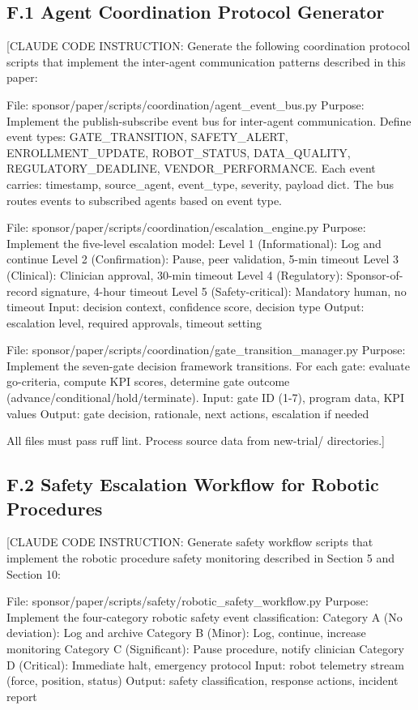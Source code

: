 \subsection*{F.1 Agent Coordination Protocol Generator}

[CLAUDE CODE INSTRUCTION: Generate the following coordination protocol scripts that
implement the inter-agent communication patterns described in this paper:

File: sponsor/paper/scripts/coordination/agent\_event\_bus.py
Purpose: Implement the publish-subscribe event bus for inter-agent communication.
Define event types: GATE\_TRANSITION, SAFETY\_ALERT, ENROLLMENT\_UPDATE,
ROBOT\_STATUS, DATA\_QUALITY, REGULATORY\_DEADLINE, VENDOR\_PERFORMANCE.
Each event carries: timestamp, source\_agent, event\_type, severity, payload dict.
The bus routes events to subscribed agents based on event type.

File: sponsor/paper/scripts/coordination/escalation\_engine.py
Purpose: Implement the five-level escalation model:
Level 1 (Informational): Log and continue
Level 2 (Confirmation): Pause, peer validation, 5-min timeout
Level 3 (Clinical): Clinician approval, 30-min timeout
Level 4 (Regulatory): Sponsor-of-record signature, 4-hour timeout
Level 5 (Safety-critical): Mandatory human, no timeout
Input: decision context, confidence score, decision type
Output: escalation level, required approvals, timeout setting

File: sponsor/paper/scripts/coordination/gate\_transition\_manager.py
Purpose: Implement the seven-gate decision framework transitions.
For each gate: evaluate go-criteria, compute KPI scores,
determine gate outcome (advance/conditional/hold/terminate).
Input: gate ID (1-7), program data, KPI values
Output: gate decision, rationale, next actions, escalation if needed

All files must pass ruff lint. Process source data from new-trial/ directories.]

\subsection*{F.2 Safety Escalation Workflow for Robotic Procedures}

[CLAUDE CODE INSTRUCTION: Generate safety workflow scripts that implement the robotic
procedure safety monitoring described in Section 5 and Section 10:

File: sponsor/paper/scripts/safety/robotic\_safety\_workflow.py
Purpose: Implement the four-category robotic safety event classification:
Category A (No deviation): Log and archive
Category B (Minor): Log, continue, increase monitoring
Category C (Significant): Pause procedure, notify clinician
Category D (Critical): Immediate halt, emergency protocol
Input: robot telemetry stream (force, position, status)
Output: safety classification, response actions, incident report

